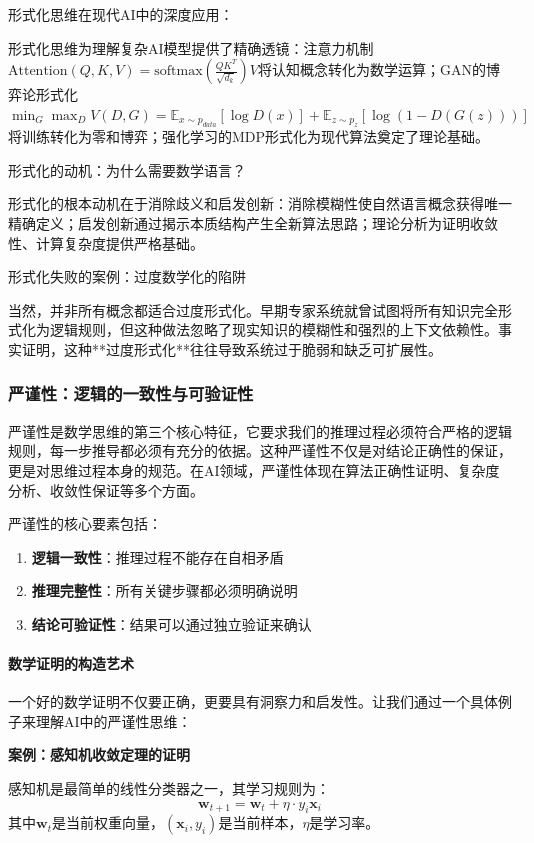 形式化思维在现代AI中的深度应用：

形式化思维为理解复杂AI模型提供了精确透镜：注意力机制$\text{Attention}(Q,K,V) = \text{softmax}(\frac{QK^T}{\sqrt{d_k}})V$将认知概念转化为数学运算；GAN的博弈论形式化$\min_G \max_D V(D,G) = \mathbb{E}_{x \sim p_{data}}[\log D(x)] + \mathbb{E}_{z \sim p_z}[\log(1-D(G(z)))]$将训练转化为零和博弈；强化学习的MDP形式化为现代算法奠定了理论基础。

形式化的动机：为什么需要数学语言？

形式化的根本动机在于消除歧义和启发创新：消除模糊性使自然语言概念获得唯一精确定义；启发创新通过揭示本质结构产生全新算法思路；理论分析为证明收敛性、计算复杂度提供严格基础。

形式化失败的案例：过度数学化的陷阱

当然，并非所有概念都适合过度形式化。早期专家系统就曾试图将所有知识完全形式化为逻辑规则，但这种做法忽略了现实知识的模糊性和强烈的上下文依赖性。事实证明，这种**过度形式化**往往导致系统过于脆弱和缺乏可扩展性。

\subsubsection{严谨性：逻辑的一致性与可验证性}

严谨性是数学思维的第三个核心特征，它要求我们的推理过程必须符合严格的逻辑规则，每一步推导都必须有充分的依据。这种严谨性不仅是对结论正确性的保证，更是对思维过程本身的规范。在AI领域，严谨性体现在算法正确性证明、复杂度分析、收敛性保证等多个方面。

严谨性的核心要素包括：
\begin{enumerate}
\item \textbf{逻辑一致性}：推理过程不能存在自相矛盾
\item \textbf{推理完整性}：所有关键步骤都必须明确说明
\item \textbf{结论可验证性}：结果可以通过独立验证来确认
\end{enumerate}

\paragraph{数学证明的构造艺术}

一个好的数学证明不仅要正确，更要具有洞察力和启发性。让我们通过一个具体例子来理解AI中的严谨性思维：

\textbf{案例：感知机收敛定理的证明}

感知机是最简单的线性分类器之一，其学习规则为：
$$\mathbf{w}_{t+1} = \mathbf{w}_t + \eta \cdot y_i \mathbf{x}_i$$
其中$\mathbf{w}_t$是当前权重向量，$(\mathbf{x}_i, y_i)$是当前样本，$\eta$是学习率。

